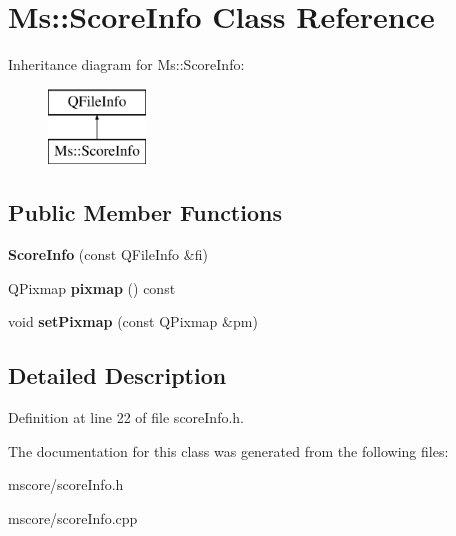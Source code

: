 \hypertarget{class_ms_1_1_score_info}{}\section{Ms\+:\+:Score\+Info Class Reference}
\label{class_ms_1_1_score_info}
Inheritance diagram for Ms\+:\+:Score\+Info\+:\begin{figure}[H]
\begin{center}
\leavevmode
\includegraphics[height=2.000000cm]{class_ms_1_1_score_info}
\end{center}
\end{figure}
\subsection*{Public Member Functions}
\begin{DoxyCompactItemize}
\item 
\mbox{\label{class_ms_1_1_score_info_a939a1a1d92932cee549106c559aaeba7}} 
{\bfseries Score\+Info} (const Q\+File\+Info \&fi)
\item 
\mbox{\label{class_ms_1_1_score_info_a9d2842158bcf98d9f3294c702e0856d7}} 
Q\+Pixmap {\bfseries pixmap} () const
\item 
\mbox{\label{class_ms_1_1_score_info_a3bef7ec345f2e64c5118413d592b04d5}} 
void {\bfseries set\+Pixmap} (const Q\+Pixmap \&pm)
\end{DoxyCompactItemize}


\subsection{Detailed Description}


Definition at line 22 of file score\+Info.\+h.



The documentation for this class was generated from the following files\+:\begin{DoxyCompactItemize}
\item 
mscore/score\+Info.\+h\item 
mscore/score\+Info.\+cpp\end{DoxyCompactItemize}
